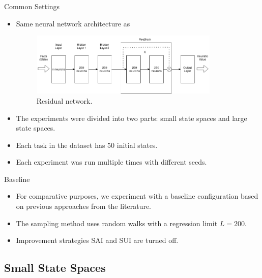 \documentclass{gkibeamer}
\begin{document}
\begin{frame}{Common Settings}
\begin{itemize}
    \item Same neural network architecture as \textcite{Ferber.etal/2022, OToole/2022}
    \begin{figure}
        \centering
        \includegraphics[width=9cm]{figures/resnet.png}
        \caption{Residual network.}
    \end{figure}
    \pause
    \item The experiments were divided into two parts: small state spaces and large state spaces.
    \pause
    \item Each task in the dataset has $50$ initial states.
    \pause
    \item Each experiment was run multiple times with different seeds.
\end{itemize}
\end{frame}

\begin{frame}{Baseline}
\begin{itemize}
    \item For comparative purposes, we experiment with a baseline configuration based on previous approaches from the literature.
    \pause
    \item The sampling method uses \alert{random walks} with a regression limit $L = 200$.
    \pause
    \item Improvement strategies SAI and SUI are turned off.
\end{itemize}
\end{frame}

\subsection{Small State Spaces}
\end{document}
